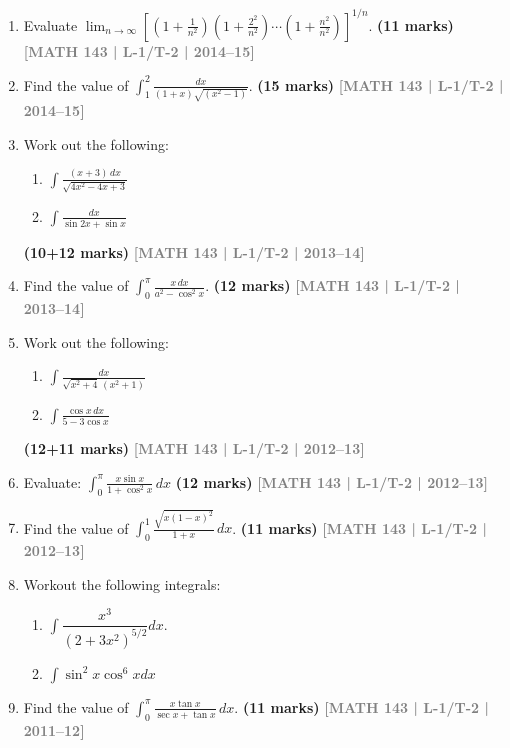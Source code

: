 \documentclass[12pt,a4paper]{article}
\newcommand{\yr}[1]{\hfill\textcolor{gray}{\small\textbf{[#1]}}}
\newcommand{\mk}[1]{\textcolor{orange!70!black}{\small\textbf{(#1 marks)}}}
\begin{document}
\begin{enumerate}
\item Evaluate $\displaystyle\lim_{n\to\infty}\left[\left(1+\frac{1}{n^{2}}\right)\left(1+\frac{2^{2}}{n^{2}}\right)\cdots\left(1+\frac{n^{2}}{n^{2}}\right)\right]^{1/n}$.
\mk{11\textonehalf} \yr{MATH 143 | L-1/T-2 | 2014--15}

\item Find the value of $\displaystyle\int_{1}^{2}\frac{dx}{(1+x)\sqrt{(x^{2}-1)}}$.
\mk{15} \yr{MATH 143 | L-1/T-2 | 2014--15}

\item Work out the following:
\begin{enumerate}
  \item $\displaystyle\int \frac{(x+3)\,dx}{\sqrt{4x^{2}-4x+3}}$
  \item $\displaystyle\int \frac{dx}{\sin 2x + \sin x}$
\end{enumerate}
\mk{10+12} \yr{MATH 143 | L-1/T-2 | 2013--14}

\item Find the value of $\displaystyle\int_{0}^{\pi}\frac{x\,dx}{a^{2}-\cos^{2}x}$.
\mk{12\textonehalf} \yr{MATH 143 | L-1/T-2 | 2013--14}

\item Work out the following:
\begin{enumerate}
  \item $\displaystyle\int \frac{dx}{\sqrt{x^{2}+4}\,(x^{2}+1)}$
  \item $\displaystyle\int \frac{\cos x\,dx}{5-3\cos x}$
\end{enumerate}
\mk{12+11} \yr{MATH 143 | L-1/T-2 | 2012--13}

\item Evaluate: $\displaystyle\int_{0}^{\pi}\frac{x\sin x}{1+\cos^{2}x}\,dx$
\mk{12\textonehalf} \yr{MATH 143 | L-1/T-2 | 2012--13}

\item Find the value of $\displaystyle\int_{0}^{1}\frac{\sqrt{x(1-x)^{2}}}{1+x}\,dx$.
\mk{11} \yr{MATH 143 | L-1/T-2 | 2012--13}

\item Workout the following integrals: 
\begin{enumerate}
    \item $\displaystyle\int\dfrac{x^3}{(2+3x^2)^{5/2}}dx$.
    \item $\displaystyle\int\sin^2 x\cos^6 xdx$
\end{enumerate}

\item Find the value of $\displaystyle\int_{0}^{\pi}\frac{x\tan x}{\sec x+\tan x}\,dx$.
\mk{11\textonehalf} \yr{MATH 143 | L-1/T-2 | 2011--12}


\end{enumerate}
\end{document}
